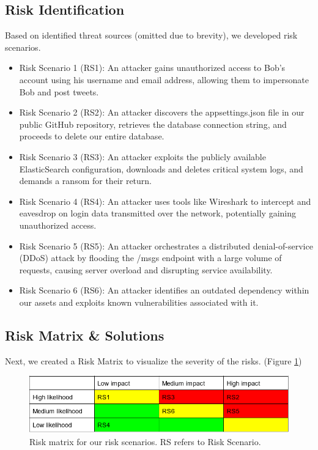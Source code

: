 \subsection{Risk Identification}

Based on identified threat sources (omitted due to brevity), we developed risk scenarios.

\begin{itemize}
\item Risk Scenario 1 (RS1): An attacker gains unauthorized access to Bob's account using his username and email address, allowing them to impersonate Bob and post tweets.
\item Risk Scenario 2 (RS2): An attacker discovers the appsettings.json file in our public GitHub repository, retrieves the database connection string, and proceeds to delete our entire database.
\item Risk Scenario 3 (RS3): An attacker exploits the publicly available ElasticSearch configuration, downloads and deletes critical system logs, and demands a ransom for their return.
\item Risk Scenario 4 (RS4): An attacker uses tools like Wireshark to intercept and eavesdrop on login data transmitted over the network, potentially gaining unauthorized access.
\item Risk Scenario 5 (RS5): An attacker orchestrates a distributed denial-of-service (DDoS) attack by flooding the /msgs endpoint with a large volume of requests, causing server overload and disrupting service availability.
\item Risk Scenario 6 (RS6): An attacker identifies an outdated dependency within our assets and exploits known vulnerabilities associated with it.
\end{itemize}

\subsection{Risk Matrix \& Solutions}

Next, we created a Risk Matrix to visualize the severity of the risks. (Figure \ref{fig:riskmatrix})

\begin{figure}[h]
\centering
\includegraphics[width=1\textwidth]{images/riskmatrix.png}
\caption{Risk matrix for our risk scenarios. RS refers to Risk Scenario.}
\label{fig:riskmatrix}
\end{figure}

